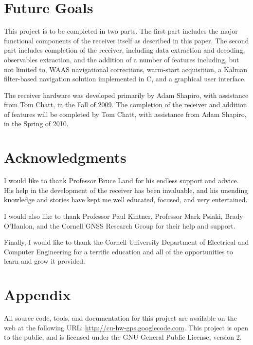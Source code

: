 \documentclass[12pt]{article}
\begin{document}
\section{Future Goals}
\label{sec:future goals}
This project is to be completed in two parts. The first part includes the major functional components of the receiver itself as described in this paper. The second part includes completion of the receiver, including data extraction and decoding, observables extraction, and the addition of a number of features including, but not limited to, WAAS navigational corrections, warm-start acquisition, a Kalman filter-based navigation solution implemented in C, and a graphical user interface.

The receiver hardware was developed primarily by Adam Shapiro, with assistance from Tom Chatt, in the Fall of 2009. The completion of the receiver and addition of features will be completed by Tom Chatt, with assistance from Adam Shapiro, in the Spring of 2010.

\section{Acknowledgments}
I would like to thank Professor Bruce Land for his endless support and advice. His help in the development of the receiver has been invaluable, and his unending knowledge and stories have kept me well educated, focused, and very entertained.

I would also like to thank Professor Paul Kintner, Professor Mark Psiaki, Brady O'Hanlon, and the Cornell GNSS Research Group for their help and support.

Finally, I would like to thank the Cornell University Department of Electrical and Computer Engineering for a terrific education and all of the opportunities to learn and grow it provided.

\section{Appendix}
All source code, tools, and documentation for this project are available on the web at the following URL: \url{http://cu-hw-gps.googlecode.com}. This project is open to the public, and is licensed under the GNU General Public License, version 2.



\nocite{misre}
\nocite{wakerly}
\end{document}
